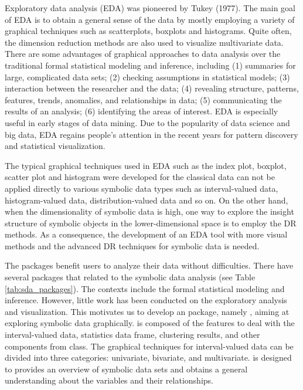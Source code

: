 \documentclass[article]{jss}
\begin{document}
Exploratory data analysis (EDA) was pioneered by Tukey (1977). The
main goal of EDA is to obtain a general sense of the data by mostly
employing a variety of graphical techniques such as scatterplots,
boxplots and histograms. Quite often, the dimension reduction methods
are also used to visualize multivariate data. There are some
advantages of graphical approaches to data analysis over the
traditional formal statistical modeling and inference, including (1)
summaries for large, complicated data sets; (2) checking assumptions
in statistical models; (3) interaction between the researcher and the
data; (4) revealing structure, patterns, features, trends, anomalies,
and relationships in data; (5) communicating the results of an
analysis; (6) identifying the areas of interest. EDA is especially
useful in early stages of data mining. Due to the popularity of data
science and big data, EDA regains people's attention in the recent
years for pattern discovery and statistical visualization.

The typical graphical techniques used in EDA such as the index plot,
boxplot, scatter plot and histogram were developed for the classical
data can not be applied directly to various symbolic data types such
as interval-valued data, histogram-valued data, distribution-valued
data and so on. On the other hand, when the dimensionality of symbolic
data is high, one way to explore the insight structure of symbolic
objects in the lower-dimensional space is to employ the DR methods. As
a consequence, the development of an EDA tool with more visual methods
and the advanced DR techniques for symbolic data is needed.

The  packages benefit users to analyze their data without
difficulties. There have several  packages that related to
the symbolic data analysis (see Table \ref{tab:sda_packages}). The
contexts include the formal statistical modeling and inference.
However, little work has been conducted on the exploratory analysis
and visualization. This motivates us to develop an 
package, namely , aiming at exploring symbolic data
graphically.  is composed of the features to deal with the
interval-valued data, statistics data frame, clustering results, and
other components from  \cite{R6} class. The graphical
techniques for interval-valued data can be divided into three
categories: univariate, bivariate, and multivariate.  is
designed to provides an overview of symbolic data sets and obtains a
general understanding about the variables and their relationships.
\end{document}
